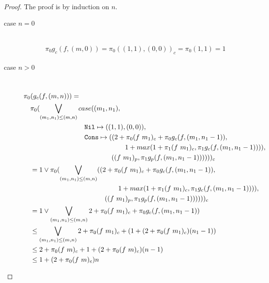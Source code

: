 \begin{proof}
   The proof is by induction on $n$.
  \begin{description}
    \item[case $n=0$]\mbox{}\\[-1.5\baselineskip]
      \begin{align*}
      \pi_0 g_c(f, (m, 0)) = \pi_0((1, 1), (0, 0))_c = \pi_0(1, 1) = 1 
      \end{align*}
    \item[case $n>0$]\mbox{}\\[-1.5\baselineskip]
      \[\begin{split}
        &\pi_0(g_c(f, (m, n))) = \\
        &\quad \pi_0(\bigvee\limits_{(m_1, n_1) \leq (m, n)} case((m_1, n_1), \\
        &\quadfive\quadfour \T{Nil} \mapsto ((1, 1), (0, 0)), \\
        &\quadfive\quadfour \T{Cons} \mapsto ((2 + \pi_0(f\ m_1)_c + \pi_0g_c(f, (m_1, n_1-1)), \\
        &\quadfive\quadten                     1 + max(1 + \pi_1(f\ m_1)_c, \pi_1g_c(f, (m_1, n_1-1)))), \\
        &\quadfive\quadeight                  ((f\ m_1)_p, \pi_1 g_p(f, (m_1, n_1-1))))) )_c \\
        &\quad = 1 \vee \pi_0(\bigvee\limits_{(m_1, n_1) \leq (m, n)} ((2 + \pi_0(f\ m_1)_c + \pi_0g_c(f, (m_1, n_1-1)), \\
        &\quadfour\quadten                     1 + max(1 + \pi_1(f\ m_1)_c, \pi_1g_c(f, (m_1, n_1-1)))), \\
        &\quadfour\quadeight                  ((f\ m_1)_p, \pi_1 g_p(f, (m_1, n_1-1))))) )_c \\
        &\quad = 1 \vee \bigvee\limits_{(m_1, n_1) \leq (m, n)} 2 + \pi_0 (f\ m_1)_c + \pi_0 g_c(f, (m_1, n_1-1)) \\
        &\quad \leq \bigvee\limits_{(m_1, n_1) \leq (m, n)} 2 + \pi_0 (f\ m_1)_c + (1 + (2 + \pi_0 (f\ m_1)_c)(n_1-1)) \\
        &\quad \leq 2 + \pi_0 (f\ m)_c + 1 + (2 + \pi_0 (f\ m)_c)(n - 1) \\
        &\quad \leq 1 + (2 + \pi_0 (f\ m)_c)n \\
      \end{split}\]
  \end{description}
\end{proof}

